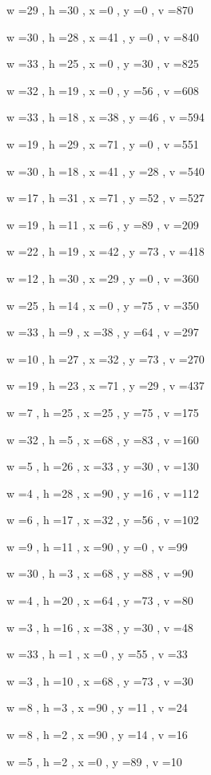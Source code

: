\documentclass[11pt]{article}
\begin{document}
w =29 , h =30 , x =0 , y =0 , v =870
\par
w =30 , h =28 , x =41 , y =0 , v =840
\par
w =33 , h =25 , x =0 , y =30 , v =825
\par
w =32 , h =19 , x =0 , y =56 , v =608
\par
w =33 , h =18 , x =38 , y =46 , v =594
\par
w =19 , h =29 , x =71 , y =0 , v =551
\par
w =30 , h =18 , x =41 , y =28 , v =540
\par
w =17 , h =31 , x =71 , y =52 , v =527
\par
w =19 , h =11 , x =6 , y =89 , v =209
\par
w =22 , h =19 , x =42 , y =73 , v =418
\par
w =12 , h =30 , x =29 , y =0 , v =360
\par
w =25 , h =14 , x =0 , y =75 , v =350
\par
w =33 , h =9 , x =38 , y =64 , v =297
\par
w =10 , h =27 , x =32 , y =73 , v =270
\par
w =19 , h =23 , x =71 , y =29 , v =437
\par
w =7 , h =25 , x =25 , y =75 , v =175
\par
w =32 , h =5 , x =68 , y =83 , v =160
\par
w =5 , h =26 , x =33 , y =30 , v =130
\par
w =4 , h =28 , x =90 , y =16 , v =112
\par
w =6 , h =17 , x =32 , y =56 , v =102
\par
w =9 , h =11 , x =90 , y =0 , v =99
\par
w =30 , h =3 , x =68 , y =88 , v =90
\par
w =4 , h =20 , x =64 , y =73 , v =80
\par
w =3 , h =16 , x =38 , y =30 , v =48
\par
w =33 , h =1 , x =0 , y =55 , v =33
\par
w =3 , h =10 , x =68 , y =73 , v =30
\par
w =8 , h =3 , x =90 , y =11 , v =24
\par
w =8 , h =2 , x =90 , y =14 , v =16
\par
w =5 , h =2 , x =0 , y =89 , v =10
\par
\newpage


\end{document}
